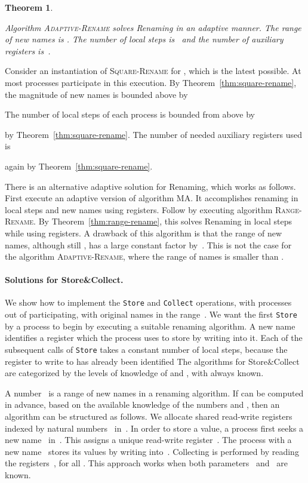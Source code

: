\documentclass[11pt]{article}
\newcommand{\BBB}{\vspace*{-\bigskipamount}}
\newcommand{\Paragraph}[1]{\BBB\paragraph{#1}}
\newcommand{\qed}{\hfill  \smallbreak}
\newenvironment{proof}{\noindent{\bf Proof:}}{\qed}
\newtheorem{theorem}{Theorem}
\begin{document}
\begin{theorem}
\label{thm:adaptive-rename}

Algorithm \textsc{Adaptive-Rename}  solves Renaming  in an adaptive manner. 
The range of new names is .
The number of local steps is~ and the number of auxiliary registers is~.
\end{theorem}

\begin{proof}
Consider an instantiation of \textsc{Square-Rename} for , which is the latest possible. 
At most  processes participate in this execution.
By Theorem~\ref{thm:square-rename}, the magnitude  of new names is bounded above by 

The number of local steps of each process is bounded from above by 

by Theorem~\ref{thm:square-rename}.
The number of needed auxiliary registers used is  

again by Theorem~\ref{thm:square-rename}. 
\end{proof}


There is an alternative adaptive solution for Renaming, which works as follows.
First execute an adaptive version of  algorithm \textsc{MA}.
It accomplishes renaming in  local steps and  new names using  registers.
Follow by executing algorithm \textsc{Range-Rename}.
By Theorem~\ref{thm:range-rename}, this solves Renaming  in  local steps while using  registers.
A drawback of this algorithm is that the range of new names, although still , has a large constant factor by~.
This is not the case for the algorithm \textsc{Adaptive-Rename}, where the range of names is smaller than .





\Paragraph{Solutions for Store\&Collect.}



We show how to implement the \texttt{Store} and \texttt{Collect} operations, with  processes out of  participating, with original names in the range~.
We want the first \texttt{Store} by a process to begin by executing a suitable renaming algorithm.
A new name identifies a register which the process uses to store by writing into it.
Each of the subsequent calls of \texttt{Store} takes a constant number of local steps, because the register to write to has already been identified 
The algorithms for Store\&Collect are categorized by the levels of knowledge of  and , with  always known.


A number~ is a range of new names in a renaming algorithm.
If  can be computed in advance, based on the available knowledge of the numbers  and , then an algorithm can be structured as follows.
We allocate  shared read-write registers  indexed by natural numbers~ in~.
In order to store a value, a process first seeks a new name~ in~.
This assigns a unique read-write register~.
The process with a new name~ stores its values by writing into~.
Collecting is performed by reading the registers~, for all .
This approach works when both parameters~ and~ are known.
\end{document}
